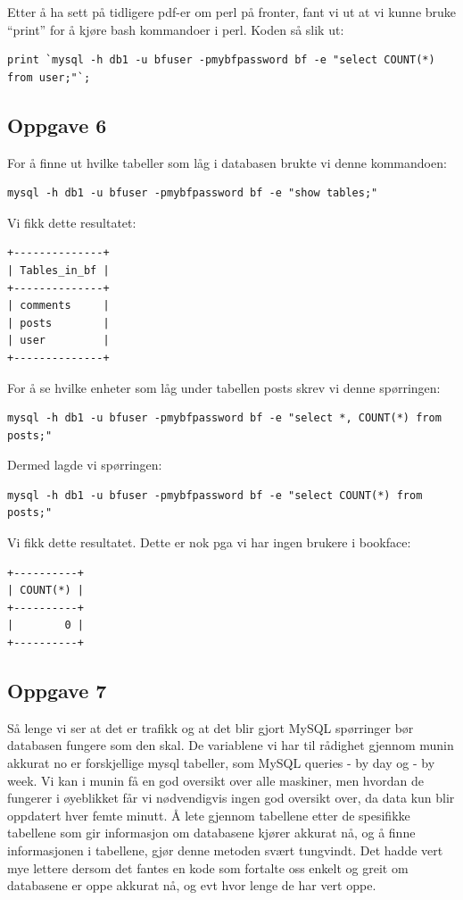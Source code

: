 \documentclass[a4paper, norsk, 12pt]{article}
\begin{document}
Etter å ha sett på tidligere pdf-er om perl på fronter, fant vi ut at vi kunne bruke “print”  for å kjøre bash kommandoer i perl. Koden så slik ut:\hspace*{\fill} \\[-\dimexpr\baselineskip+\parskip\relax]
\begin{verbatim}
print `mysql -h db1 -u bfuser -pmybfpassword bf -e "select COUNT(*) from user;"`;
\end{verbatim}

\subsection{Oppgave 6}
For å finne ut hvilke tabeller som låg i databasen brukte vi denne kommandoen: \hspace*{\fill} \\[-\dimexpr\baselineskip+\parskip\relax]
\begin{verbatim}
mysql -h db1 -u bfuser -pmybfpassword bf -e "show tables;"
\end{verbatim}

Vi fikk dette resultatet:
\begin{verbatim}
+--------------+
| Tables_in_bf |
+--------------+
| comments     |
| posts        |
| user         |
+--------------+
\end{verbatim}
For å se hvilke enheter som låg under tabellen posts skrev  vi denne spørringen: \hspace*{\fill} \\[-\dimexpr\baselineskip+\parskip\relax]
\begin{verbatim}
mysql -h db1 -u bfuser -pmybfpassword bf -e "select *, COUNT(*) from posts;"
\end{verbatim}
Dermed lagde vi spørringen:\hspace*{\fill} \\[-\dimexpr\baselineskip+\parskip\relax]
\begin{verbatim}
mysql -h db1 -u bfuser -pmybfpassword bf -e "select COUNT(*) from posts;"
\end{verbatim}
Vi fikk dette resultatet. Dette er nok pga vi har ingen brukere i bookface:
\begin{verbatim}
+----------+
| COUNT(*) |
+----------+
|        0 |
+----------+
\end{verbatim}
\subsection{Oppgave 7}
Så lenge vi ser at det er trafikk og at det blir gjort MySQL spørringer bør databasen fungere som den skal. De variablene vi har til rådighet gjennom munin akkurat no er forskjellige mysql tabeller, som MySQL queries - by day og - by week. Vi kan i munin få en god oversikt over alle maskiner, men hvordan de fungerer i øyeblikket får vi nødvendigvis ingen god oversikt over, da data kun blir oppdatert hver femte minutt. Å lete gjennom tabellene etter de spesifikke tabellene som gir informasjon om databasene kjører akkurat nå, og å finne informasjonen i tabellene, gjør denne metoden svært tungvindt. Det hadde vert mye lettere dersom det fantes en kode som fortalte oss enkelt og greit om databasene er oppe akkurat nå, og evt hvor lenge de har vert oppe.
\end{document}
